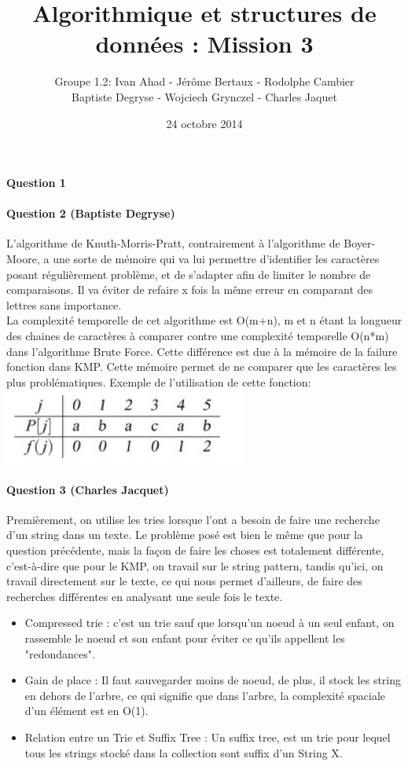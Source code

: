 \documentclass[a4paper]{article}
\title{Algorithmique et structures de données : Mission 3}
\date{24 octobre 2014}
\author{Groupe 1.2: Ivan Ahad - Jérôme Bertaux - Rodolphe Cambier \\ 
	Baptiste Degryse - Wojciech Grynczel - Charles Jaquet}
\begin{document}
\maketitle

\paragraph*{Question 1}
\paragraph*{Question 2 (Baptiste Degryse)}
L'algorithme de Knuth-Morris-Pratt, contrairement à l'algorithme de Boyer-Moore, a une sorte de mémoire qui va lui permettre d'identifier les caractères posant régulièrement problème, et de s'adapter afin de limiter le nombre de comparaisons. Il va éviter de refaire x fois la même erreur en comparant des lettres sans importance.\\

La complexité temporelle de cet algorithme est O(m+n), m et n étant la longueur des chaines de caractères à comparer contre une complexité temporelle O(n*m) dans l'algorithme Brute Force. Cette différence est due à la mémoire de la failure fonction dans  KMP. Cette mémoire permet de ne comparer que les caractères les plus problématiques. Exemple de l'utilisation de cette fonction:\\
\includegraphics[scale=1]{imgFailure.png}

\paragraph*{Question 3 (Charles Jacquet)} 

Premièrement, on utilise les tries lorsque l'ont a besoin de faire une recherche d'un string dans un texte. Le problème posé est bien le même que pour la question précédente, mais la façon de faire les choses est totalement différente, c'est-à-dire que pour le KMP, on travail sur le string pattern, tandis qu'ici, on travail directement sur le texte, ce qui nous permet d'ailleurs, de faire des recherches différentes en analysant une seule fois le texte.
\begin{itemize}
\item {Compressed trie} : c'est un trie sauf que lorsqu'un noeud à un seul enfant, on rassemble le noeud et son enfant pour éviter ce qu'ils appellent les "redondances".
\item {Gain de place} : Il faut sauvegarder moins de noeud, de plus, il stock les string en dehors de l'arbre, ce qui signifie que dans l'arbre, la complexité spaciale d'un élément est en O(1).
\item {Relation entre un Trie et Suffix Tree} : Un suffix tree, est un trie pour lequel tous les strings stocké dans la collection sont suffix d'un String X.
\end{itemize}
\end{document}
